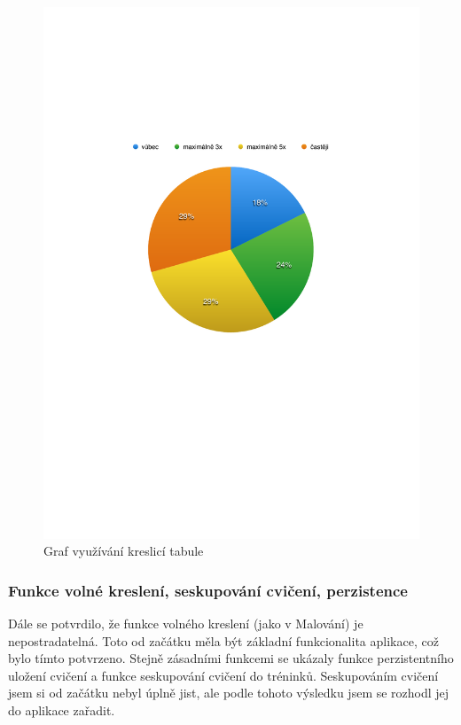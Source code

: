 \documentclass[thesis=B,czech]{FITthesis}[2012/06/26]
\begin{document}
	\begin{figure}
		\includegraphics{img/graph_table_usage}
		\caption{Graf využívání kreslicí tabule}\label{graph:table_usage}
	\end{figure}

\subsubsection{Funkce volné kreslení, seskupování cvičení, perzistence}

	Dále se potvrdilo, že funkce volného kreslení (jako v Malování) je nepostradatelná. Toto od začátku měla být základní funkcionalita aplikace, což bylo tímto potvrzeno. Stejně zásadními funkcemi se ukázaly funkce perzistentního uložení cvičení a funkce seskupování cvičení do tréninků. Seskupováním cvičení jsem si od začátku nebyl úplně jist, ale podle tohoto výsledku jsem se rozhodl jej do aplikace zařadit.
\end{document}

